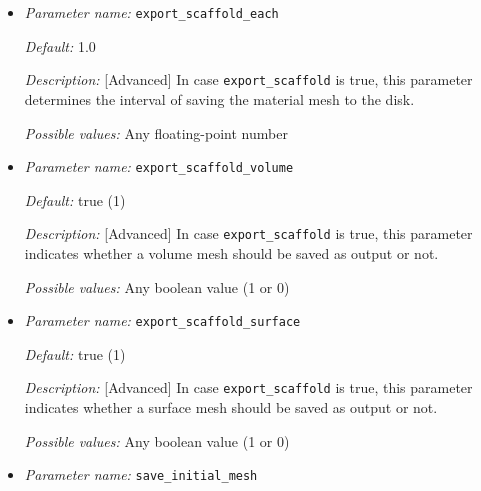 \begin{itemize}

{\it Default:} false (0)

{\it Description:} [Advanced] Indicates if the degrading material should be exported as a single entity for further analysis like in a structural mechanics simulation. It works based on Mmg level set meshing.

{\it Possible values:} Any boolean value (1 or 0)


\item {\it Parameter name:} {\tt export\_scaffold\_each}
\label{parameters:export_scaffold_each}


{\it Default:} 1.0

{\it Description:} [Advanced] In case {\tt export\_scaffold} is true, this parameter determines the interval of saving the material mesh to the disk.

{\it Possible values:} Any floating-point number


\item {\it Parameter name:} {\tt export\_scaffold\_volume}
\label{parameters:export_scaffold_volume}


{\it Default:} true (1)

{\it Description:} [Advanced] In case {\tt export\_scaffold} is true, this parameter indicates whether a volume mesh should be saved as output or not.

{\it Possible values:} Any boolean value (1 or 0)


\item {\it Parameter name:} {\tt export\_scaffold\_surface}
\label{parameters:export_scaffold_surface}


{\it Default:} true (1)

{\it Description:} [Advanced] In case {\tt export\_scaffold} is true, this parameter indicates whether a surface mesh should be saved as output or not.

{\it Possible values:} Any boolean value (1 or 0)


\item {\it Parameter name:} {\tt save\_initial\_mesh}
\label{parameters:save_initial_mesh}


\end{itemize}
